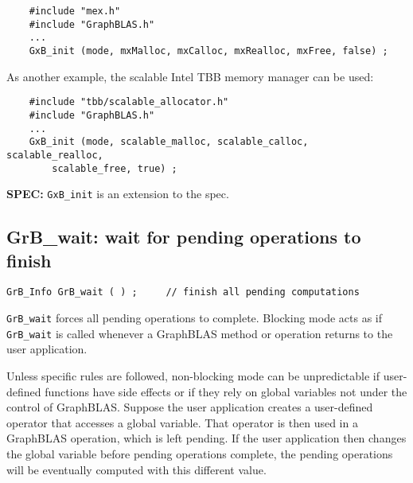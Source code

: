 \documentclass[12pt]{article}
\begin{document}
    {\footnotesize
    \begin{verbatim}
    #include "mex.h"
    #include "GraphBLAS.h"
    ...
    GxB_init (mode, mxMalloc, mxCalloc, mxRealloc, mxFree, false) ; \end{verbatim}}

As another example, the scalable Intel TBB memory manager can be used:

    {\footnotesize
    \begin{verbatim}
    #include "tbb/scalable_allocator.h"
    #include "GraphBLAS.h"
    ...
    GxB_init (mode, scalable_malloc, scalable_calloc, scalable_realloc,
        scalable_free, true) ; \end{verbatim}}

\begin{spec}
{\bf SPEC:} \verb'GxB_init' is an extension to the spec.
\end{spec}

\newpage
\subsection{{\sf GrB\_wait:} wait for pending operations to finish} %
\label{wait}

\begin{mdframed}[userdefinedwidth=6in]
{\footnotesize
\begin{verbatim}
GrB_Info GrB_wait ( ) ;     // finish all pending computations
\end{verbatim}
}\end{mdframed}

\verb'GrB_wait' forces all pending operations to complete.
Blocking mode acts as if \verb'GrB_wait' is called whenever a GraphBLAS
method or operation returns to the user application.

Unless specific rules are followed, non-blocking mode can be unpredictable if
user-defined functions have side effects or if they rely on global variables
not under the control of GraphBLAS.  Suppose the user application creates a
user-defined operator that accesses a global variable.  That operator is then
used in a GraphBLAS operation, which is left pending.  If the user application
then changes the global variable before pending operations complete, the
pending operations will be eventually computed with this different value.
\end{document}
